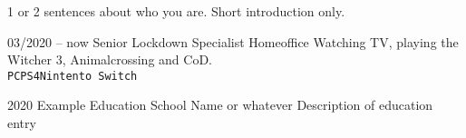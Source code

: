 \documentclass[9pt]{developercv} %
\begin{document}
\begin{minipage}[t]{0.4\textwidth} %
	\vspace{-\baselineskip} %

	1 or 2 sentences about who you are. Short introduction only.

\end{minipage}
\hfill %
\begin{minipage}[t]{0.53\textwidth} %
	\vspace{-\baselineskip} %
	\begin{barchart}{7}
	\end{barchart}
\end{minipage}



\begin{entrylist}

	\entry
	{03/2020 -- now}
	{Senior Lockdown Specialist}
	{Homeoffice}
	{Watching TV, playing the Witcher 3, Animalcrossing and CoD.
		\\ \texttt{PC}\slashsep\texttt{PS4}\slashsep\texttt{Nintento Switch}
	}

\end{entrylist}

\pagebreak
{}
\begin{entrylist}

	\entry
	{2020}
	{Example Education}
	{School Name or whatever}
	{Description of education entry}

\end{entrylist}

\end{document}
